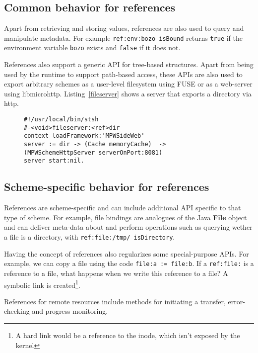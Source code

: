 \documentclass[preprint,authoryear]{llncs}
\begin{document}
\subsection{Common behavior for references}
\label{common-reference-behavior}
Apart from retrieving and storing values, references are also used to query and manipulate
metadata.  For example {\tt ref:env:bozo isBound} returns {\tt true} if the environment
variable {\tt bozo} exists and {\tt false} if it does not.

References also support a generic API for tree-based structures.   Apart from being used
by the runtime to support path-based access, these APIs are also used to export arbitrary
schemes as a user-level filesystem using FUSE or as a web-server using libmicrohttp.
Listing~\ref{fileserver} shows a server that exports a directory via http.

\begin{figure}[htbp]
\begin{lstlisting}[style=L,label=fileserver,caption=Exporting a directory via http.]
#!/usr/local/bin/stsh
#-<void>fileserver:<ref>dir
context loadFramework:'MPWSideWeb'
server := dir -> (Cache memoryCache)  ->  (MPWSchemeHttpServer serverOnPort:8081)
server start:nil.
\end{lstlisting}
\end{figure}



\subsection{Scheme-specific behavior for references}

References are scheme-specific and can include additional API specific to that type of scheme.
For example, file bindings are analogues of the Java {\bf File} object and can deliver
meta-data about and perform operations such as querying wether a file is a directory, with
{\tt ref:file:/tmp/ isDirectory}.


Having the concept of references also regularizes some special-purpose APIs.  For example,
we can copy a file using the code {\tt file:a := file:b}.  If a {\tt ref:file:} is a reference to a file, what
happens when we write this reference to a file?  A symbolic link is created\footnote{A hard link
would be a reference to the inode, which isn't exposed by the kernel}.

References for remote resources include methods for initiating a transfer,
error-checking and progress monitoring.  
\end{document}
